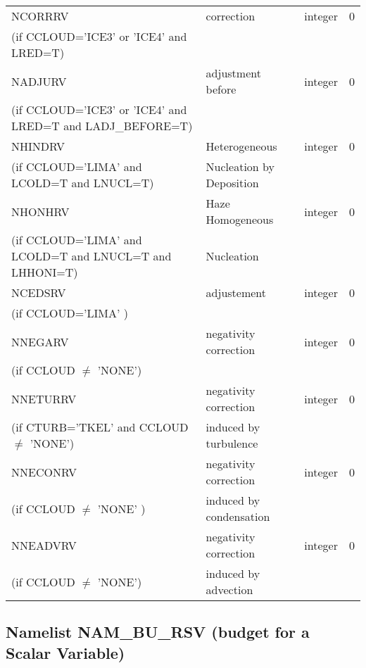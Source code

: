 \begin{longtable} {|p{}|p{}|>{\centering}p{}|p{}<{\centering}|}
NCORRRV  & correction          & integer  &  0 \index{NCORRRV!\innam{NAM\_BU\_RRV}}\\ \nopagebreak
(if CCLOUD='ICE3' or 'ICE4' and LRED=T) & &   &  \\\hline
NADJURV  & adjustment before          & integer  &  0 \index{NADJURV!\innam{NAM\_BU\_RRV}}\\ \nopagebreak
(if CCLOUD='ICE3' or 'ICE4' and LRED=T and LADJ\_BEFORE=T) & &   &  \\\hline
NHINDRV   & Heterogeneous & integer  &  0 \index{NHINDRV!\innam{NAM\_BU\_RRV}}\\ \nopagebreak
(if CCLOUD='LIMA' and LCOLD=T and LNUCL=T) & Nucleation by Deposition  &   &  \\\hline
NHONHRV   &Haze Homogeneous   & integer  &  0 \index{NHONHRV!\innam{NAM\_BU\_RRV}}\\ \nopagebreak
(if CCLOUD='LIMA' and LCOLD=T and LNUCL=T and LHHONI=T) & Nucleation  &   &  \\\hline
NCEDSRV   & adjustement & integer  &  0 \index{NCEDSRV!\innam{NAM\_BU\_RRV}}\\ \nopagebreak
(if CCLOUD='LIMA'  ) & &   &  \\\hline
NNEGARV   & negativity correction & integer  &  0 \index{NNEGARV!\innam{NAM\_BU\_RRV}}\\ \nopagebreak
(if CCLOUD $\neq$ 'NONE') & &   &  \\\hline
NNETURRV   & negativity correction  & integer  &  0 \index{NNETURRV!\innam{NAM\_BU\_RRV}}\\ \nopagebreak
(if CTURB='TKEL' and CCLOUD $\neq$ 'NONE') & induced by turbulence&   &  \\\hline
 NNECONRV  & negativity correction & integer  &  0 \index{NNECONRV!\innam{NAM\_BU\_RRV}}\\ \nopagebreak
(if CCLOUD $\neq$ 'NONE' ) & induced by condensation&   &  \\\hline
NNEADVRV&negativity correction   & integer  &  0 \index{NNEADVRV!\innam{NAM\_BU\_RRV}}\\ \nopagebreak
(if CCLOUD $\neq$ 'NONE') & induced by advection&   &  \\\hline
\end{longtable}

\subsection{Namelist NAM\_BU\_RSV (budget for a Scalar Variable)}


